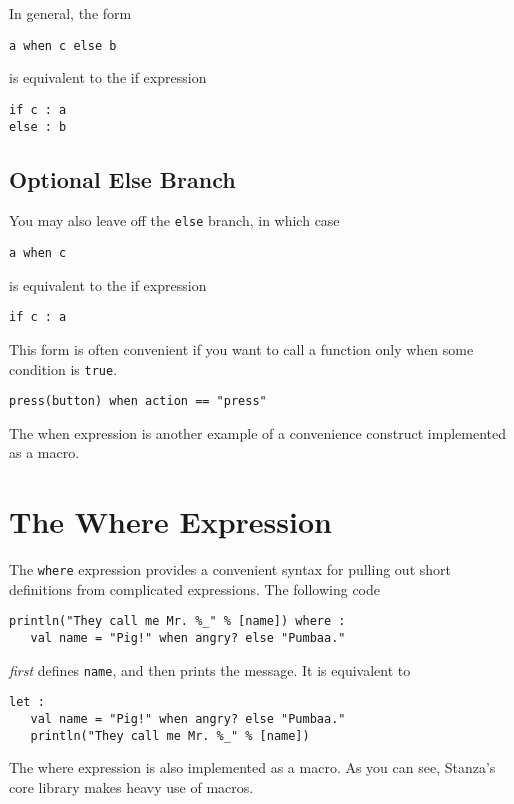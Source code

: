\documentclass[10pt,oneside]{book}
\begin{document}
In general, the form
\begin{lstlisting}
a when c else b
\end{lstlisting}
is equivalent to the if expression
\begin{lstlisting}
if c : a
else : b
\end{lstlisting}

\subsection*{Optional Else Branch}
You may also leave off the \texttt{\frenchspacing else} branch, in which case
\begin{lstlisting}
a when c
\end{lstlisting}
is equivalent to the if expression
\begin{lstlisting}
if c : a
\end{lstlisting}

This form is often convenient if you want to call a function only when some condition is \texttt{\frenchspacing true}.
\begin{lstlisting}
press(button) when action == "press"
\end{lstlisting}

The when expression is another example of a convenience construct implemented as a macro. 

\section{The Where Expression}
The \texttt{\frenchspacing where} expression provides a convenient syntax for pulling out short definitions from complicated expressions. The following code
\begin{lstlisting}
println("They call me Mr. %_" % [name]) where :
   val name = "Pig!" when angry? else "Pumbaa."
\end{lstlisting}
{\em first} defines \texttt{\frenchspacing name}, and then prints the message. It is equivalent to
\begin{lstlisting}
let :
   val name = "Pig!" when angry? else "Pumbaa."
   println("They call me Mr. %_" % [name])
\end{lstlisting}

The where expression is also implemented as a macro. As you can see, Stanza's core library makes heavy use of macros.
\end{document}
